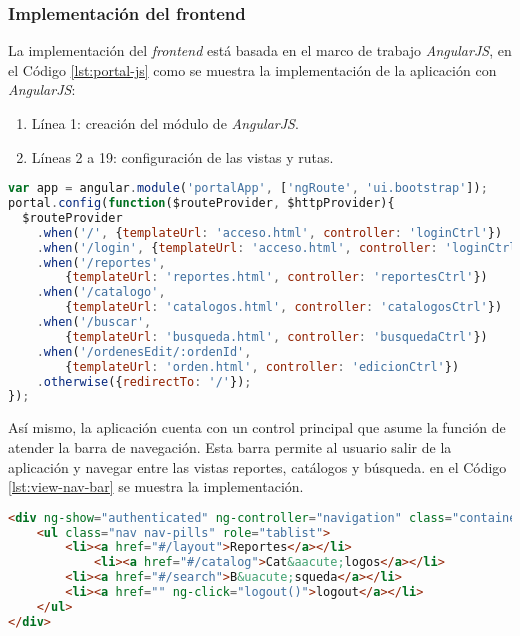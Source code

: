 \subsubsection{Implementación del frontend}\label{sec:frontend}
La implementación del \textit{frontend} está basada en el marco de trabajo \textit{AngularJS}, en el Código \ref{lst:portal-js} como se muestra la implementación de la aplicación con \textit{AngularJS}:
\begin{enumerate}
	\item Línea 1: creación del módulo de \textit{AngularJS}.
	\item Líneas 2 a 19: configuración de las vistas y rutas.
\end{enumerate}
\begin{lstlisting}[language=Javascript, caption={Módulo de \textit{AngularJS} para el Portal Web.}, captionpos=b, label={lst:portal-js}]
var app = angular.module('portalApp', ['ngRoute', 'ui.bootstrap']);
portal.config(function($routeProvider, $httpProvider){
  $routeProvider
	.when('/', {templateUrl: 'acceso.html', controller: 'loginCtrl'})
	.when('/login', {templateUrl: 'acceso.html', controller: 'loginCtrl'})
	.when('/reportes',
		{templateUrl: 'reportes.html', controller: 'reportesCtrl'})
	.when('/catalogo',
		{templateUrl: 'catalogos.html', controller: 'catalogosCtrl'})
	.when('/buscar',
		{templateUrl: 'busqueda.html', controller: 'busquedaCtrl'})
	.when('/ordenesEdit/:ordenId',
		{templateUrl: 'orden.html', controller: 'edicionCtrl'})
	.otherwise({redirectTo: '/'});
});
\end{lstlisting}

Así mismo, la aplicación cuenta con un control principal que asume la función de atender la barra de navegación. Esta barra permite al usuario salir de la aplicación y navegar entre las vistas reportes, catálogos y búsqueda. en el Código \ref{lst:view-nav-bar} se muestra la implementación.

\begin{lstlisting}[language=HTML, captionpos=b, caption={Barra de navegación.}, label={lst:view-nav-bar}]
<div ng-show="authenticated" ng-controller="navigation" class="container">
	<ul class="nav nav-pills" role="tablist">
		<li><a href="#/layout">Reportes</a></li>
			<li><a href="#/catalog">Cat&aacute;logos</a></li> 
		<li><a href="#/search">B&uacute;squeda</a></li>
		<li><a href="" ng-click="logout()">logout</a></li>
	</ul>
</div>
\end{lstlisting}

